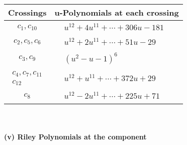 \documentclass[1p]{elsarticle_modified}
\theoremstyle{definition}
\begin{document}
\begin{tabular}{m{50pt}|m{274pt}}
Crossings & \hspace{64pt}u-Polynomials at each crossing \\
\hline $$\begin{aligned}c_{1},c_{10}\end{aligned}$$&$\begin{aligned}
&u^{12}+4 u^{11}+\cdots+306 u-181
\end{aligned}$\\
\hline $$\begin{aligned}c_{2},c_{5},c_{6}\end{aligned}$$&$\begin{aligned}
&u^{12}+2 u^{11}+\cdots+51 u-29
\end{aligned}$\\
\hline $$\begin{aligned}c_{3},c_{9}\end{aligned}$$&$\begin{aligned}
&(u^2- u-1)^6
\end{aligned}$\\
\hline $$\begin{aligned}c_{4},c_{7},c_{11}\\c_{12}\end{aligned}$$&$\begin{aligned}
&u^{12}+u^{11}+\cdots+372 u+29
\end{aligned}$\\
\hline $$\begin{aligned}c_{8}\end{aligned}$$&$\begin{aligned}
&u^{12}-2 u^{11}+\cdots+225 u+71
\end{aligned}$\\
\hline
\end{tabular}\\~\\
\newpage\renewcommand{\arraystretch}{1}
\flushleft \textbf{(v) Riley Polynomials at the component}\newline \\
\end{document}
